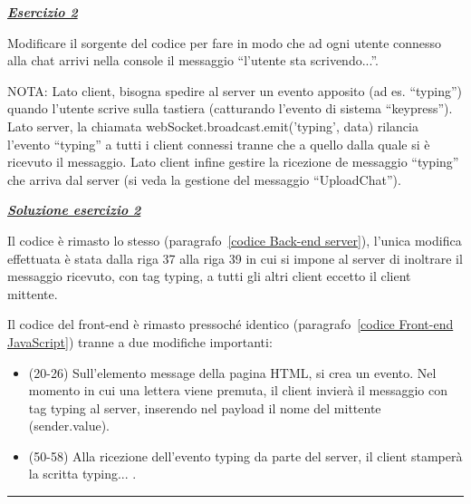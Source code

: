 \documentclass[a4paper]{article}
\newcommand{\longline}{\noindent\rule{\textwidth}{0.4pt}}
\newcommand{\dquotes}[1]{``#1''}
\begin{document}
	\noindent	
	\textcolor{Red3}{\textbf{\emph{\underline{Esercizio 2}}}}\newline
	
	\noindent
	Modificare il sorgente del codice per fare in modo che ad ogni utente connesso alla chat arrivi nella console il messaggio \dquotes{l'utente sta scrivendo...}.\newline
	
	\noindent
	NOTA: Lato client, bisogna spedire al server un evento apposito (ad es. \dquotes{typing}) quando l'utente scrive sulla tastiera (catturando l'evento di sistema \dquotes{keypress}). Lato server, la chiamata \textsf{webSocket.broadcast.emit('typing', data)} rilancia l'evento \dquotes{typing} a tutti i client connessi tranne che a quello dalla quale si è ricevuto il messaggio. Lato client infine gestire la ricezione de messaggio \dquotes{typing} che arriva dal server (si veda la gestione del messaggio \dquotes{UploadChat}).\newline
	
	\noindent	
	\textcolor{Green4}{\textbf{\emph{\underline{Soluzione esercizio 2}}}}\newline
	
	\noindent
	
	Il codice è rimasto lo stesso (paragrafo~\ref{codice Back-end server}), l'unica modifica effettuata è stata dalla riga 37 alla riga 39 in cui si impone al server di inoltrare il messaggio ricevuto, con tag \textsf{typing}, a tutti gli altri client eccetto il client mittente.\newpage
	
	\noindent
	\newpage
	
	\noindent
	Il codice del front-end è rimasto pressoché identico (paragrafo~\ref{codice Front-end JavaScript}) tranne a due modifiche importanti:
	\begin{itemize}
		\item (20-26) Sull'elemento \textsf{message} della pagina HTML, si crea un evento. Nel momento in cui una lettera viene premuta, il client invierà il messaggio con tag \textsf{typing} al server, inserendo nel payload il nome del mittente (\textsf{sender.value}).
		
		\item (50-58) Alla ricezione dell'evento \textsf{typing} da parte del server, il client stamperà la scritta \textsf{typing...} .
	\end{itemize}
	
	\longline\newline
	
\end{document}
